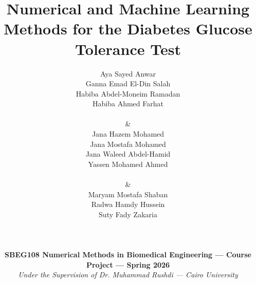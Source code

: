 \documentclass[9pt, conference]{IEEEtran}
\begin{document}
\title{\selectfont\color{ieeeblue}\textbf{Numerical and Machine Learning Methods for the Diabetes Glucose Tolerance Test}}

\author{
    \begin{tabular}{ccc}
        \parbox{2.1in}{\centering
            Aya Sayed Anwar\\
            Ganna Emad El-Din Salah\\
            Habiba Abdel-Moneim Ramadan\\
            Habiba Ahmed Farhat\\[1ex]
            
        } & 
        \parbox{2.1in}{\centering
            Jana Hazem Mohamed\\
            Jana Mostafa Mohamed\\
            Jana Waleed Abdel-Hamid\\
            Yassen Mohamed Ahmed\\[1ex]
        
        } & 
        \parbox{2.1in}{\centering
            Maryam Mostafa Shaban\\
            Radwa Hamdy Hussein\\
            Suty Fady Zakaria\\[1ex]
        
        }
    \end{tabular}\\[1ex] %
    \normalfont\normalsize
    \colorbox{lightbg}{
      \parbox{0.96\textwidth}{\centering \footnotesize \color{ieeeblue} \textbf{SBEG108 Numerical Methods in Biomedical Engineering --- Course Project --- Spring 2026} \\ \textit{Under the Supervision of Dr. Muhammad Rushdi --- Cairo University}}
    }
}
\end{document}
